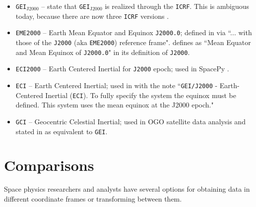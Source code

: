 \documentclass[draft]{agujournal2019}
\begin{document}
\begin{itemize}
    \item \texttt{GEI}$_\mathrm{J2000}$ --  state that \texttt{GEI}$_\mathrm{J2000}$ is realized through the \texttt{ICRF}. This is ambiguous today, because there are now three \texttt{ICRF} versions \cite{Charlot2020}.

    \item \texttt{EME2000} -- Earth Mean Equator and Equinox \texttt{J2000.0}; defined in  via ``... with those of the \texttt{J2000} (aka \texttt{EME2000}) reference frame".  defines as ``Mean Equator and Mean Equinox of \texttt{J2000.0}" in its definition of \texttt{J2000}.

    \item \texttt{ECI2000} -- Earth Centered Inertial for \texttt{J2000} epoch; used in SpacePy \cite{Niehof2022, SpacePy}.

    \item \texttt{ECI} -- Earth Centered Inertial; used in  with the note ``\texttt{GEI/J2000} - Earth-Centered Inertial (\texttt{ECI}). To fully specify the system the equinox must be defined. This system uses the mean equinox at the J2000 epoch."

   \item \texttt{GCI} -- Geocentric Celestial Inertial; used in OGO satellite data analysis \cite{NASA1970} and stated in  as equivalent to \texttt{GEI}.

\end{itemize}

\section{Comparisons}
\label{sect:comparisons}

Space physics researchers and analysts have several options for obtaining data in different coordinate frames or transforming between them.
\end{document}
